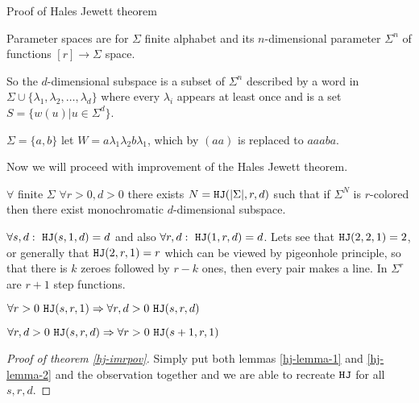 \begin{topic}{Proof of Hales Jewett theorem}
	\begin{defn}
		Parameter spaces are for $\Sigma$ finite alphabet and its $n$-dimensional parameter $\Sigma^n$ of functions $[r] \to \Sigma$ space.
	\end{defn}

	So the $d$-dimensional subspace is a subset of $\Sigma^n$ described by a word in $\Sigma \cup \{\lambda_1, \lambda_2, \dots, \lambda_d\}$ where every $\lambda_i$ appears at least once and is a set $S = \{w(u) | u \in \Sigma^d\}$.
	
	\begin{example}
		$\Sigma = \{a,b\}$ let $W = a \lambda_1 \lambda_2 b \lambda_1$, which by $(aa)$ is replaced to $aaaba$.
	\end{example}

	Now we will proceed with improvement of the Hales Jewett theorem.
	
	\begin{thm}
		$\forall$ finite $\Sigma$ $\forall r > 0, d > 0$ there exists $N = \mathtt{HJ}(|\Sigma|, r, d)$ such that if $\Sigma^N$ is $r$-colored then there exist monochromatic $d$-dimensional subspace.
		\label{hj-imrpov}
	\end{thm}

	\begin{observ}
		$\forall s, d: \ \mathtt{HJ} (s, 1, d) = d$ and also $\forall r, d: \ \mathtt{HJ}(1, r, d) = d$. Lets see that $\mathtt{HJ}(2,2,1) = 2$, or generally that $\mathtt{HJ}(2,r,1) = r$ which can be viewed by pigeonhole principle, so that there is $k$ zeroes followed by $r - k$ ones, then every pair makes a line. In $\Sigma^r$ are $r + 1$ step functions.
	\end{observ}

	\begin{lemma}
		$\forall r > 0 \ \mathtt{HJ}(s,r,1) \Rightarrow \forall r, d > 0 \ \mathtt{HJ}(s,r,d)$
		\label{hj-lemma-1}
	\end{lemma}

	\begin{lemma}
		$\forall r, d > 0 \ \mathtt{HJ}(s,r,d) \Rightarrow \forall r > 0 \ \mathtt{HJ}(s+1, r, 1)$
		\label{hj-lemma-2}
	\end{lemma}

	\begin{proof}[Proof of theorem \ref{hj-imrpov}]
		Simply put both lemmas \ref{hj-lemma-1} and \ref{hj-lemma-2}
		and the observation together and we are able to recreate $\mathtt{HJ}$
		for all $s, r, d$.
	\end{proof}


\end{topic}

